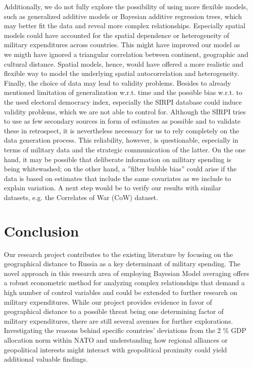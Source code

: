 \documentclass[12pt,a4paper]{article}
\begin{document}
Additionally, we do not fully explore the possibility of using more flexible models, such as generalized additive models or Bayesian additive regression trees, which may better fit the data and reveal more complex relationships. Especially spatial models could have accounted for the spatial dependence or heterogeneity of military expenditures across countries. This might have improved our model as we migth have ignored a triangular correlation between continent, geographic and cultural distance. Spatial models, hence, would have offered a more realistic and flexible way to model the underlying spatial autocorrelation and heterogeneity.\\

Finally, the choice of data may lead to validity problems. Besides to already mentioned limitation of generalization w.r.t. time and the possible bias w.r.t. to the used electoral democracy index, especially the SIRPI database could induce validity problems, which we are not able to control for. Although the SIRPI tries to use as few secondary sources in form of estimates as possible and to validate these in retrospect, it is nevertheless necessary for us to rely completely on the data generation process. This reliability, however, is questionable, especially in terms of military data and the strategic communication of the latter. On the one hand, it may be possible that deliberate information on military spending is being whitewashed; on the other hand, a ''filter bubble bias'' could arise if the data is based on estimates that include the same covariates as we include to explain variation. A next step would be to verify our results with similar datasets, e.g. the Correlates of War (CoW) dataset.


\section{Conclusion}
Our research project contributes to the existing literature by focusing on the geographical distance to Russia as a key determinant of military spending. The novel approach in this research area of employing Bayesian Model averaging offers a robust econometric method for analyzing complex relationships that demand a high number of control variables and could be extended to further research on military expenditures. 
While our project provides evidence in favor of geographical distance to a possible threat being one determining factor of military expenditures, there are still several avenues for further explorations. Investigating the reasons behind specific countries’ deviations from the 2 \% GDP allocation norm within NATO and understanding how regional alliances or geopolitical interests might interact with geopolitical proximity could yield additional valuable findings. 
\end{document}
